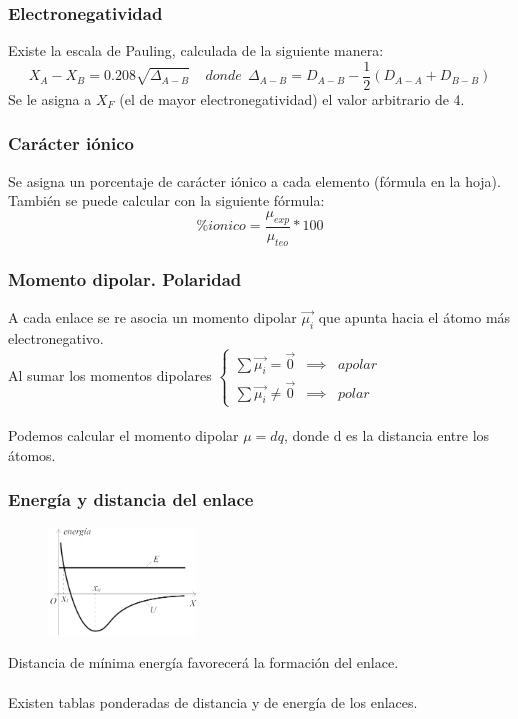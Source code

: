 \documentclass[12pt]{article}
\begin{document}
\subsubsection{Electronegatividad}
Existe la escala de Pauling, calculada de la siguiente manera:
\[X_A-X_B=0.208\sqrt{\Delta_{A-B}}\ \ \ \ \ donde \ \ \Delta_{A-B}=D_{A-B}-\frac{1}{2}(D_{A-A}+D_{B-B})\]
Se le asigna a $X_F$ (el de mayor electronegatividad) el valor arbitrario de 4.
\subsubsection{Carácter iónico}
Se asigna un porcentaje de carácter iónico a cada elemento (fórmula en la hoja).\\
También se puede calcular con la siguiente fórmula:
\[\% ionico=\frac{\mu_{exp}}{\mu_{teo}}*100 \]
\subsubsection{Momento dipolar. Polaridad}
A cada enlace se re asocia un momento dipolar $\vec{\mu_i}$ que apunta hacia el átomo más electronegativo.\\
Al sumar los momentos dipolares 
\( \left\{
\begin{array}{ccc}
	\sum{\vec{\mu_i}}=\vec{0}  &  \implies  &  apolar\\
	\sum{\vec{\mu_i}}\neq\vec{0}  &  \implies  &  polar
\end{array} 
\right.
\)\\
\\
Podemos calcular  el momento dipolar \(\mu=dq\), donde d es la distancia entre los átomos.
\subsubsection{Energía y distancia del enlace}
\begin{figure}
    \centering
    \includegraphics[width=0.35\textwidth]{Distancia_enlace}
\end{figure}
Distancia de mínima energía favorecerá la formación del enlace.\\
\\
Existen tablas ponderadas de distancia y de energía de los enlaces.
\\ \\ \\ \\ \\ \\ 
\end{document}
